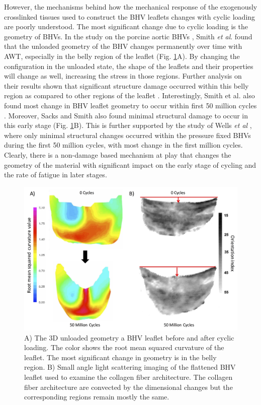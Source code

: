 	However, the mechanisms behind how the mechanical response of the exogenously crosslinked tissues used to construct the BHV leaflets changes with cyclic loading are poorly understood. 
	The most significant change due to cyclic loading is the geometry of BHVs. 
	In the study on the porcine aortic BHVs \cite{smith_high_1997},  Smith \textit{et al}. found that the unloaded geometry of the BHV changes permanently over time with AWT, especially in the belly region of the leaflet (Fig. \ref{fig:PSeffects}A). 
	By changing the configuration in the unloaded state, the shape of the leaflets and their properties will change as well, increasing the stress in those regions. 
	Further analysis on their results shown that significant structure damage occurred within this belly region as compared to other regions of the leaflet \cite{smith_fatigue_1999}.  
	Interestingly, Smith et al. also found most change in BHV leaflet geometry to occur within first 50 million cycles \cite{smith_high_1997}. 
	Moreover, Sacks and Smith \cite{sacks_effect_1997} also found minimal structural damage to occur in this early stage (Fig. \ref{fig:PSeffects}B). 
This is further supported by the study of Wells \textit{et al} \cite{wells_cyclic_2005}, where only minimal structural changes occurred within the pressure fixed BHVs during the first 50 million cycles, with most change in the first million cycles.  
	Clearly, there is a non-damage based mechanism at play that changes the geometry of the material with significant impact on the early stage of cycling and the rate of fatigue in later stages. 
	
\begin{figure}[hbt]
\centering
\includegraphics[width=0.55\paperwidth]{Images/chapter4/figure1.jpg}
\caption{A) The 3D unloaded geometry a BHV leaflet before and after cyclic loading. The color shows the root mean squared curvature of the leaflet. The most significant change in geometry is in the belly region. B) Small angle light scattering imaging of the flattened BHV leaflet used to examine the collagen fiber architecture. The collagen fiber architecture are convected by the dimensional changes but the corresponding regions remain mostly the same.}
\label{fig:PSeffects}
\end{figure}





